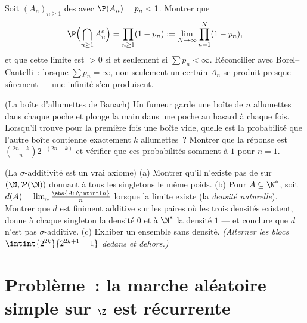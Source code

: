 \begin{exercise}[$\star\star$]\label{exo:b2:proba:10}
Soit $(A_n)_{n\geq1}$ des  avec $\P(A_n) =
p_n < 1$. Montrer que
\[
\P\Bigl(\bigcap_{n\geq1}A_n^c\Bigr)
= \prod_{n\geq1}(1 - p_n)
:= \lim_{N\to\infty}\prod_{n=1}^N(1 - p_n),
\]
et que cette limite est $> 0$ si et seulement si $\sum p_n <
\infty$. Réconcilier avec Borel--Cantelli~: lorsque $\sum p_n =
\infty$, non seulement un certain $A_n$ se produit presque sûrement ---
une infinité s'en produisent.
\end{exercise}

\begin{exercise}[$\star\star$]\label{exo:b2:proba:11}
(La boîte d'allumettes de Banach) Un fumeur garde une boîte de $n$ allumettes dans
chaque poche et plonge la main dans une poche  au hasard à chaque
fois. Lorsqu'il trouve pour la première fois une boîte vide, quelle est la probabilité
que l'autre boîte contienne exactement $k$ allumettes~? Montrer que la
réponse est $\binom{2n-k}{n}2^{-(2n-k)}$ et vérifier que ces
probabilités somment à $1$ pour $n = 1$.
\end{exercise}

\begin{exercise}[$\star\star\star$]\label{exo:b2:proba:12}
(La $\sigma$-additivité est un vrai axiome)
(a) Montrer qu'il n'existe pas de  sur $(\N,
\mathcal P(\N))$ donnant à tous les singletons le même poids.
(b) Pour $A \subseteq \N^*$, soit $d(A) =
\lim_n\frac{\abs{A\cap\intint1n}}{n}$ lorsque la limite existe
(la \emph{densité naturelle}). Montrer que $d$ est finiment additive
sur les paires où les trois densités existent, donne à chaque
singleton la densité $0$ et à $\N^*$ la densité $1$ --- et conclure
que $d$ n'est pas $\sigma$-additive.
(c) Exhiber un ensemble sans densité. \emph{(Alterner les blocs
$\intint{2^{2k}}{2^{2k+1}-1}$ dedans et dehors.)}
\end{exercise}

\section{Problème~: la marche aléatoire simple sur $\Z$ est récurrente}

